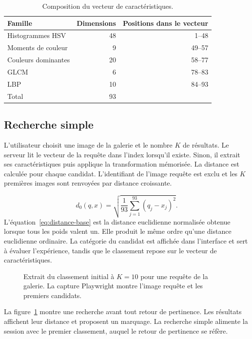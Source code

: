 \begin{table}[ht]
  \centering
  \begin{tabular}{@{}lrr@{}}
    \toprule
    Famille & Dimensions & Positions dans le vecteur \\
    \midrule
    Histogrammes HSV & 48 & 1--48 \\
    Moments de couleur & 9 & 49--57 \\
    Couleurs dominantes & 20 & 58--77 \\
    GLCM & 6 & 78--83 \\
    LBP & 10 & 84--93 \\
    \midrule
    Total & 93 & \\
    \bottomrule
  \end{tabular}
  \caption{Composition du vecteur de caractéristiques.}
  \label{tab:vecteur}
\end{table}

\clearpage
\subsection{Recherche simple}
L'utilisateur choisit une image de la galerie et le nombre \(K\) de résultats. Le serveur lit le vecteur de la requête dans l'index lorsqu'il existe. Sinon, il extrait ses caractéristiques puis applique la transformation mémorisée. La distance est calculée pour chaque candidat. L'identifiant de l'image requête est exclu et les \(K\) premières images sont renvoyées par distance croissante.

\begin{equation}
  d_0(q,x)=\sqrt{\frac{1}{93}\sum_{j=1}^{93}(q_j-x_j)^2}.
  \label{eq:distance-base}
\end{equation}
L'équation~\eqref{eq:distance-base} est la distance euclidienne normalisée obtenue lorsque tous les poids valent un. Elle produit le même ordre qu'une distance euclidienne ordinaire. La catégorie du candidat est affichée dans l'interface et sert à évaluer l'expérience, tandis que le classement repose sur le vecteur de caractéristiques.

\begin{figure}[ht]
  \centering
  \caption{Extrait du classement initial à \(K=10\) pour une requête de la galerie. La capture Playwright montre l'image requête et les premiers candidats.}
  \label{fig:recherche-simple}
\end{figure}

La figure~\ref{fig:recherche-simple} montre une recherche avant tout retour de pertinence. Les résultats affichent leur distance et proposent un marquage. La recherche simple alimente la session avec le premier classement, auquel le retour de pertinence se réfère.

